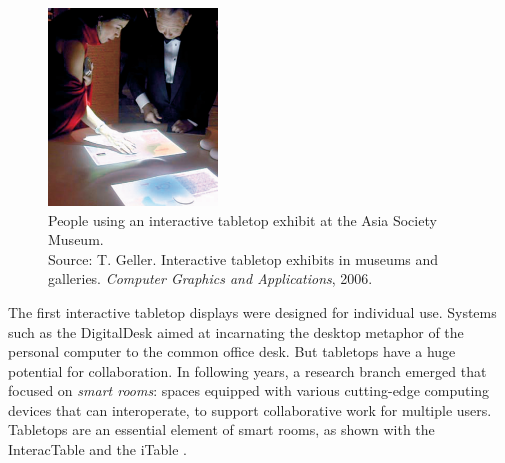 \begin{figure}[htb]
  \centering
    \includegraphics[width=0.4\textwidth]{images/visitors}
  \caption{People using an interactive tabletop exhibit at the Asia Society Museum.\\Source: T. Geller. Interactive tabletop exhibits in museums and galleries. \emph{Computer Graphics and Applications}, 2006.}
  \label{fig:visitors}
\end{figure}

The first interactive tabletop displays were designed for individual use.
Systems such as the DigitalDesk \citep{Wellner:1993:digitaldesk} aimed at incarnating the desktop metaphor of the personal computer to the common office desk.
But tabletops have a huge potential for collaboration.
In following years, a research branch emerged that focused on \emph{smart rooms}: spaces equipped with various cutting-edge computing devices that can interoperate, to support collaborative work for multiple users.
Tabletops are an essential element of smart rooms, as shown with the InteracTable \citep{Streitz:1999:iland} and the iTable \citep{Johanson:2002:iroom}.

